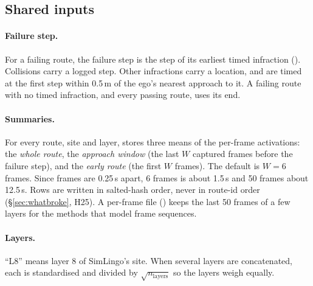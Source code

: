 \subsection{Shared inputs}
\label{sec:inputs}

\paragraph{Failure step.}
For a failing route, the failure step is the step of its earliest timed
infraction (). Collisions carry a logged step.
Other infractions carry a location, and are timed at the first step within
0.5\,m of the ego's nearest approach to it.
A failing route with no timed infraction, and every passing route, uses its end.

\paragraph{Summaries.}
For every route, site and layer,  stores three means of the
per-frame activations: the \emph{whole route}, the \emph{approach window} (the
last $W$ captured frames before the failure step), and the \emph{early route}
(the first $W$ frames).
The default is $W=6$ frames. Since frames are 0.25\,s apart, 6 frames is about
1.5\,s and 50 frames about 12.5\,s.
Rows are written in salted-hash order, never in route-id order
(\S\ref{sec:whatbroke}, H25). A per-frame file () keeps the
last 50 frames of a few layers for the methods that model frame sequences.

\paragraph{Layers.}
``L8'' means layer 8 of SimLingo's  site. When several
layers are concatenated, each is standardised and divided by
$\sqrt{n_{\text{layers}}}$ so the layers weigh equally.


